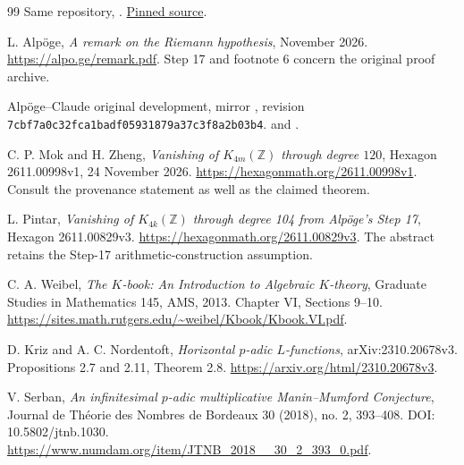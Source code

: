 \begin{thebibliography}{99}
Same repository, .
\href{https://github.com/lsernau/grh-lean/blob/72fead102f663d5c7a407964a13dc0cf9d977207/grh/src/New/Congruences/FirstOrder/TrianglePrimes.lean}{Pinned source}.

L. Alp\"oge, \emph{A remark on the Riemann hypothesis}, November 2026.
\url{https://alpo.ge/remark.pdf}. Step 17 and footnote 6 concern the
original proof archive.

Alp\"oge--Claude original development, mirror
, revision
\texttt{7cbf7a0c32fca1badf05931879a37c3f8a2b03b4}.
\href{https://github.com/CocoSgt/riemann-hypothesis-lean/blob/7cbf7a0c32fca1badf05931879a37c3f8a2b03b4/src/Development/AutomorphicArithmetic/AutomorphicVarieties/SmallClassNumbers/CorGKOf.lean}{} and
\href{https://github.com/CocoSgt/riemann-hypothesis-lean/blob/7cbf7a0c32fca1badf05931879a37c3f8a2b03b4/src/Development/AutomorphicArithmetic/AutomorphicVarieties/ModularityArgument/ThresholdArguments/DenseThresholdCases/NumberU3US.lean}{}.

C. P. Mok and H. Zheng,
\emph{Vanishing of \(K_{4m}(\mathbb Z)\) through degree \(120\)},
Hexagon 2611.00998v1, 24 November 2026.
\url{https://hexagonmath.org/2611.00998v1}.
Consult the provenance statement as well as the claimed theorem.

L. Pintar, \emph{Vanishing of \(K_{4k}(\mathbb Z)\) through degree 104
from Alp\"oge's Step 17}, Hexagon 2611.00829v3.
\url{https://hexagonmath.org/2611.00829v3}.
The abstract retains the Step-17 arithmetic-construction assumption.

C. A. Weibel, \emph{The \(K\)-book: An Introduction to Algebraic
\(K\)-theory}, Graduate Studies in Mathematics 145, AMS, 2013.
Chapter VI, Sections 9--10.
\url{https://sites.math.rutgers.edu/~weibel/Kbook/Kbook.VI.pdf}.

D. Kriz and A. C. Nordentoft, \emph{Horizontal \(p\)-adic \(L\)-functions},
arXiv:2310.20678v3. Propositions 2.7 and 2.11, Theorem 2.8.
\url{https://arxiv.org/html/2310.20678v3}.

V. Serban, \emph{An infinitesimal \(p\)-adic multiplicative
Manin--Mumford Conjecture}, Journal de Th\'eorie des Nombres de Bordeaux
30 (2018), no. 2, 393--408. DOI: 10.5802/jtnb.1030.
\url{https://www.numdam.org/item/JTNB_2018__30_2_393_0.pdf}.


\end{thebibliography}
